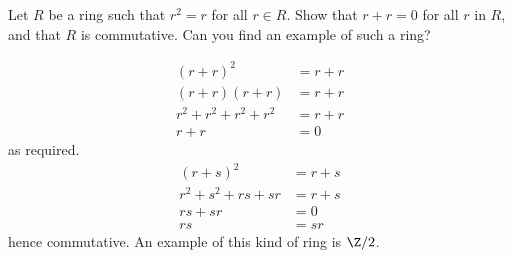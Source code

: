 \setcounter{question}{4}
\question Let $R$ be a ring such that $r^2 = r$ for all $r \in R$. Show that $r + r = 0$ for all $r$ in $R$, and that $R$ is commutative. Can you find an example of such a ring?
\begin{solution}
    \begin{align*}
        (r + r)^2               &= r + r                \\
        (r + r)(r + r)          &= r + r                \\
        r^2 + r^2 + r^2 + r^2   &= r + r                \\
        r + r                   &= 0
    \end{align*}
    as required.
    \begin{align*}
        (r + s)^2               &= r + s                \\
        r^2 + s^2 + rs + sr     &= r + s                \\
        rs + sr                 &= 0                    \\
        rs                      &= sr
    \end{align*}
    hence commutative. An example of this kind of ring is $\Z/2$.
\end{solution}

\setcounter{question}{6}
\question
{}
